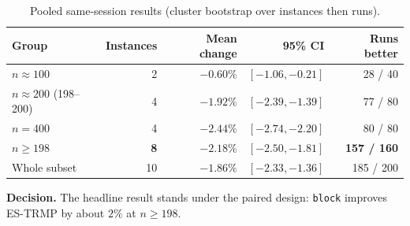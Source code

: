 \begin{table}[htbp]
\centering
\caption{Pooled same-session results (cluster bootstrap over instances then runs).}
\label{tab:pooled}
\small
\begin{tabular}{lrrrr}
\toprule
\textbf{Group} & \textbf{Instances} & \textbf{Mean change} & \textbf{95\% CI} & \textbf{Runs better}\\
\midrule
$n\approx100$ & 2 & $-0.60\%$ & $[-1.06,-0.21]$ & 28 / 40\\
$n\approx200$ (198--200) & 4 & $-1.92\%$ & $[-2.39,-1.39]$ & 77 / 80\\
$n=400$ & 4 & $-2.44\%$ & $[-2.74,-2.20]$ & 80 / 80\\
\textbf{$n\ge198$} & \textbf{8} & $\mathbf{-2.18\%}$ & $\mathbf{[-2.50,-1.81]}$ & \textbf{157 / 160}\\
Whole subset & 10 & $-1.86\%$ & $[-2.33,-1.36]$ & 185 / 200\\
\bottomrule
\end{tabular}
\end{table}

\textbf{Decision.} The headline result stands under the paired design: \texttt{block} improves ES-TRMP by about $2\%$ at $n\ge198$.

